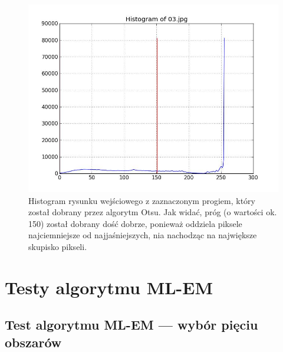 \documentclass[10pt]{llncs}
\begin{document}
\begin{figure}[h!]
  \centering
  \includegraphics[scale=.3, clip]{img/04_histogram.jpg}
	\caption[]
  {Histogram rysunku wejściowego z zaznaczonym progiem, który został dobrany przez algorytm Otsu. Jak widać, próg (o wartości ok. 150) został dobrany dość dobrze, ponieważ oddziela piksele najciemniejsze od najjaśniejszych, nia nachodząc na największe skupisko pikseli.}
\end{figure}

\clearpage
\section{Testy algorytmu ML-EM}

\subsection{Test algorytmu ML-EM --- wybór pięciu obszarów}
\end{document}
